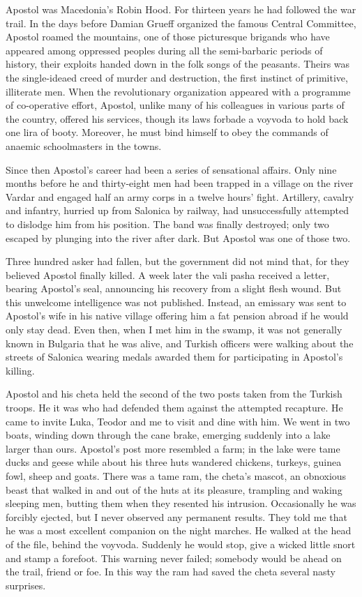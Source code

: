 \documentclass[a5paper,12pt]{book}
\begin{document}
Apostol was Macedonia’s Robin Hood. For thirteen years he had followed the war trail. In the days before Damian Grueff organized the famous Central Committee, Apostol roamed the mountains, one of those picturesque brigands who have appeared among oppressed peoples during all the semi-barbaric periods of history, their exploits handed down in the folk songs of the peasants. Theirs was the single-ideaed creed of murder and destruction, the first instinct of primitive, illiterate men.
When the revolutionary organization appeared with a programme of co-operative effort, Apostol, unlike many of his colleagues in various parts of the country, offered his services, though its laws forbade a voyvoda to hold back one lira of booty. Moreover, he must bind himself to obey the commands of anaemic schoolmasters in the towns. 

Since then Apostol’s career had been a series of sensational affairs. Only nine months before he and thirty-eight men had been trapped in a village on the river Vardar and engaged half an army corps in a twelve hours’ fight. Artillery, cavalry and infantry, hurried up from Salonica by railway, had unsuccessfully attempted to dislodge him from his position. The band was finally destroyed; only two escaped by plunging into the river after dark. But Apostol was one of those two. 

Three hundred asker had fallen, but the government did not mind that, for they believed Apostol finally killed. A week later the vali pasha received a letter, bearing Apostol’s seal, announcing his recovery from a slight flesh wound. But this unwelcome intelligence was not published. Instead, an emissary was sent to Apostol’s wife in his native village offering him a fat pension abroad if he would only stay dead. Even then, when I met him in the swamp, it was not generally known in Bulgaria that he was alive, and Turkish officers were walking about the streets of Salonica wearing medals awarded them for participating in Apostol’s killing. 

Apostol and his cheta held the second of the two posts taken from the Turkish troops. He it was who had defended them against the attempted recapture. He came to invite Luka, Teodor and me to visit and dine with him. We went in two boats, winding down through the cane brake, emerging suddenly into a lake larger than ours. Apostol's post more resembled a farm; in the lake were tame ducks and geese while about his three huts wandered chickens, turkeys, guinea fowl, sheep and goats. There was a tame ram, the cheta’s mascot, an obnoxious beast that walked in and out of the huts at its pleasure, trampling and waking sleeping men, butting them when they resented his intrusion. Occasionally he was forcibly ejected, but I never observed any permanent results. They told me that he was a most excellent companion on the night marches. He walked at the head of the file, behind the voyvoda. Suddenly he would stop, give a wicked little snort and stamp a forefoot. This warning never failed; somebody would be ahead on the trail, friend or foe. In this way the ram had saved the cheta several nasty surprises. 
\end{document}
